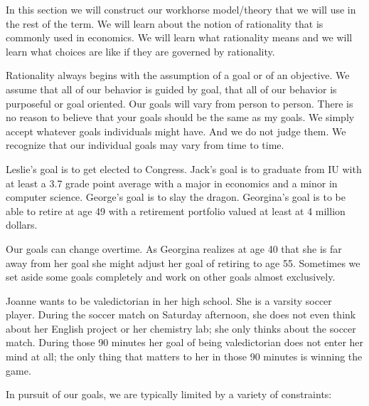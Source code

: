\documentclass[
]{book}
\begin{document}
In this section we will construct our workhorse model/theory that we will use in the rest of the term. We will learn about the notion of rationality that is commonly used in economics. We will learn what rationality means and we will learn what choices are like if they are governed by rationality.

Rationality always begins with the assumption of a goal or of an objective. We assume that all of our behavior is guided by goal, that all of our behavior is purposeful or goal oriented. Our goals will vary from person to person. There is no reason to believe that your goals should be the same as my goals. We simply accept whatever goals individuals might have. And we do not judge them. We recognize that our individual goals may vary from time to time.

Leslie's goal is to get elected to Congress. Jack's goal is to graduate from IU with at least a 3.7 grade point average with a major in economics and a minor in computer science. George's goal is to slay the dragon. Georgina's goal is to be able to retire at age 49 with a retirement portfolio valued at least at 4 million dollars.

Our goals can change overtime. As Georgina realizes at age 40 that she is far away from her goal she might adjust her goal of retiring to age 55. Sometimes we set aside some goals completely and work on other goals almost exclusively.

Joanne wants to be valedictorian in her high school. She is a varsity soccer player. During the soccer match on Saturday afternoon, she does not even think about her English project or her chemistry lab; she only thinks about the soccer match. During those 90 minutes her goal of being valedictorian does not enter her mind at all; the only thing that matters to her in those 90 minutes is winning the game.

In pursuit of our goals, we are typically limited by a variety of constraints:
\end{document}

